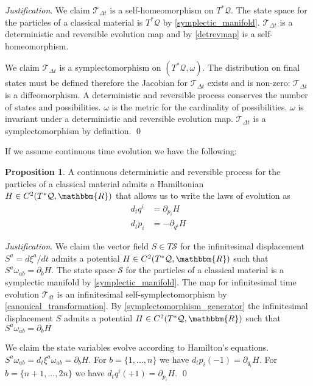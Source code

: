 \documentclass[aps,pra,10pt,twocolumn,floatfix,nofootinbib]{revtex4-1}
\numberwithin{equation}{section}
\theoremstyle{definition}
\newtheorem{prop}[equation]{Proposition}
\newenvironment{justification}{\emph{Justification}.}{\qed}
\begin{document}
\begin{justification}
	We claim $\mathcal{T}_{\Delta t}$ is a self-homeomorphism on $T^*\mathcal{Q}$. The state space for the particles of a classical material is $T^*\mathcal{Q}$ by \ref{symplectic_manifold}. $\mathcal{T}_{\Delta t}$ is a deterministic and reversible evolution map and by \ref{detrevmap} is a self-homeomorphism.
	
	We claim $\mathcal{T}_{\Delta t}$ is a symplectomorphism on $(T^*\mathcal{Q}, \omega)$. The distribution on final states must be defined  therefore the Jacobian for $\mathcal{T}_{\Delta t}$ exists and is non-zero: $\mathcal{T}_{\Delta t}$ is a diffeomorphism. A deterministic and reversible process conserves the number of states and possibilities. $\omega$ is the metric for the cardinality of possibilities. $\omega$ is invariant under a deterministic and reversible evolution map. $\mathcal{T}_{\Delta t}$ is a symplectomorphism by definition.
\end{justification}

If we assume continuous time evolution we have the following:

\begin{prop}\label{hamiltons_equations}
	A continuous deterministic and reversible process for the particles of a classical material admits a Hamiltonian $H \in C^2(T^*\mathcal{Q}, \mathbbm{R})$ that allows us to write the laws of evolution as
\begin{align*}
d_{t}q^i &= \partial_{p_i} H \\
d_{t}p_i &= - \partial_{q^i} H
\end{align*}
\end{prop}

\begin{justification}
We claim the vector field $S \in T\mathcal{S}$ for the infinitesimal displacement $S^a = d\xi^a/dt$ admits a potential $H \in C^2(T^*\mathcal{Q}, \mathbbm{R})$ such that $S^{a} \omega_{ab} = \partial_{b}H$. The state space $\mathcal{S}$ for the particles of a classical material is a symplectic manifold by \ref{symplectic_manifold}. The map for infinitesimal time evolution $\mathcal{T}_{dt}$ is an infinitesimal self-symplectomorphism by \ref{canonical_transformation}. By \ref{symplectomorphism_generator} the infinitesimal displacement $S$ admits a potential $H \in C^2(T^*\mathcal{Q}, \mathbbm{R})$ such that $S^{a} \omega_{ab} = \partial_{b}H$

We claim the state variables evolve according to Hamilton's equations. $S^{a} \omega_{ab} = d_t\xi^a \omega_{ab} = \partial_{b}H$. For $b=\{1,...,n\}$ we have $d_tp_i (-1) = \partial_{q_i} H$. For $b=\{n+1,...,2n\}$ we have $d_tq^i (+1) = \partial_{p_i} H$.
\end{justification}
\end{document}

